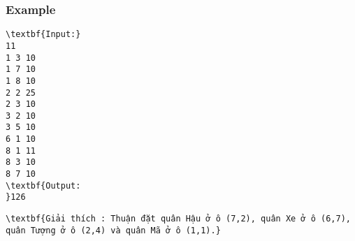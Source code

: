 \subsubsection{Example}
\begin{verbatim}
\textbf{Input:}
11
1 3 10
1 7 10
1 8 10
2 2 25
2 3 10
3 2 10
3 5 10
6 1 10
8 1 11
8 3 10
8 7 10
\textbf{Output:
}126\end{verbatim}
\begin{verbatim}
\textbf{Giải thích : Thuận đặt quân Hậu ở ô (7,2), quân Xe ở ô (6,7), quân Tượng ở ô (2,4) và quân Mã ở ô (1,1).}\end{verbatim}